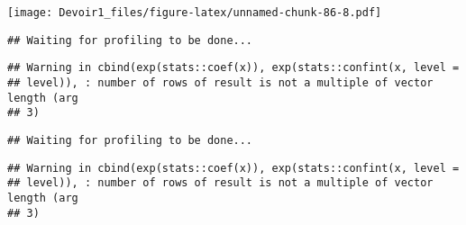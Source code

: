 \documentclass[]{article}
\newenvironment{Shaded}{\begin{snugshade}}{\end{snugshade}}
\newcommand{\KeywordTok}[1]{\textcolor[rgb]{0.13,0.29,0.53}{\textbf{#1}}}
\newcommand{\DataTypeTok}[1]{\textcolor[rgb]{0.13,0.29,0.53}{#1}}
\newcommand{\DecValTok}[1]{\textcolor[rgb]{0.00,0.00,0.81}{#1}}
\newcommand{\StringTok}[1]{\textcolor[rgb]{0.31,0.60,0.02}{#1}}
\newcommand{\OperatorTok}[1]{\textcolor[rgb]{0.81,0.36,0.00}{\textbf{#1}}}
\newcommand{\NormalTok}[1]{#1}
\begin{document}
\texttt{[image: Devoir1\_files/figure-latex/unnamed-chunk-86-8.pdf]}

\begin{Shaded}
\end{Shaded}

\begin{verbatim}
## Waiting for profiling to be done...
\end{verbatim}

\begin{verbatim}
## Warning in cbind(exp(stats::coef(x)), exp(stats::confint(x, level =
## level)), : number of rows of result is not a multiple of vector length (arg
## 3)
\end{verbatim}

\begin{verbatim}
## Waiting for profiling to be done...
\end{verbatim}

\begin{verbatim}
## Warning in cbind(exp(stats::coef(x)), exp(stats::confint(x, level =
## level)), : number of rows of result is not a multiple of vector length (arg
## 3)
\end{verbatim}
\end{document}
